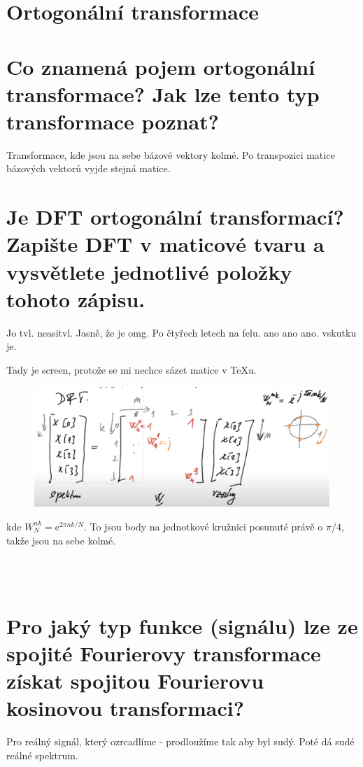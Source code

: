 \documentclass[a4paper,12pt]{article}   %
\newcommand{\mt}[1]{$#1$}
\newcommand{\e}{\text{e}}
\newcommand{\okruh}[1]{\section*{\Large #1}}
\begin{document}
\okruh{Ortogonální transformace}
\section{Co znamená pojem ortogonální transformace? Jak lze tento typ transformace poznat?}
Transformace, kde jsou na sebe bázové vektory kolmé.
Po transpozici matice bázových vektorů vyjde stejná matice. 


\section{Je DFT ortogonální transformací? Zapište DFT v maticové tvaru a vysvětlete jednotlivé položky tohoto zápisu.}
Jo tvl. neasitvl. Jasně, že je omg. Po čtyřech letech na felu. ano ano ano. vskutku je.

Tady je screen, protože se mi nechce sázet matice v TeXu.
\begin{figure}[h!]
        \centering
        \includegraphics[width=.6\textwidth]{fig/DFT_matrix.png}
\end{figure}
kde \mt{W_N^{nk} = \e^{2\pi n k/N}}. To jsou body na jednotkové kružnici posunuté právě o \mt{\pi/4}, takže jsou na sebe kolmé. 

\begin{center}
        \Ladiesroom~~\Ladiesroom~~\Ladiesroom~~\Ladiesroom~~\Ladiesroom~~\Ladiesroom~~\Ladiesroom~~\Ladiesroom~~\Ladiesroom~~\Ladiesroom~~\Ladiesroom~~\Ladiesroom~~\Ladiesroom~~\Ladiesroom~~\Ladiesroom~~\Ladiesroom~~\Ladiesroom~~\Ladiesroom~~\Ladiesroom~~\Ladiesroom~~\Ladiesroom~~\Ladiesroom~~\Ladiesroom~~\Ladiesroom~~\Ladiesroom~~\Ladiesroom~~\Ladiesroom~~\Ladiesroom~~\Ladiesroom~~\Ladiesroom~~\Ladiesroom~~\Ladiesroom~~\Ladiesroom~~\Ladiesroom~~\Ladiesroom~~\Ladiesroom~~\Ladiesroom~~\Ladiesroom~~\Ladiesroom~~\Ladiesroom~~\Ladiesroom~~\Ladiesroom~~\Ladiesroom~~\Ladiesroom~~\Ladiesroom
\end{center}
        \FloatBarrier

\section{Pro jaký typ funkce (signálu) lze ze spojité Fourierovy transformace získat spojitou Fourierovu kosinovou transformaci?}
Pro reálný signál, který ozrcadlíme - prodloužíme tak aby byl sudý. Poté dá sudé reálné spektrum.
\end{document}
